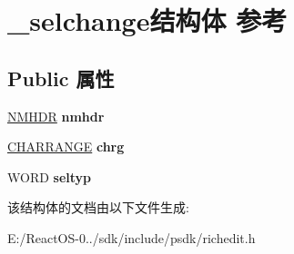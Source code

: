 \hypertarget{struct__selchange}{}\section{\+\_\+selchange结构体 参考}
\label{struct__selchange}
\subsection*{Public 属性}
\begin{DoxyCompactItemize}
\item 
\mbox{\label{struct__selchange_a1f16a68c9e0024296833b0f063557d1f}} 
\hyperlink{structtag_n_m_h_d_r}{N\+M\+H\+DR} {\bfseries nmhdr}
\item 
\mbox{\label{struct__selchange_aefb08b17b259bf3f477f85651635ddba}} 
\hyperlink{struct__charrange}{C\+H\+A\+R\+R\+A\+N\+GE} {\bfseries chrg}
\item 
\mbox{\label{struct__selchange_a6920c4d0859c2a58bbe802a9fcce62f6}} 
W\+O\+RD {\bfseries seltyp}
\end{DoxyCompactItemize}


该结构体的文档由以下文件生成\+:\begin{DoxyCompactItemize}
\item 
E\+:/\+React\+O\+S-\/0../sdk/include/psdk/richedit.\+h\end{DoxyCompactItemize}
